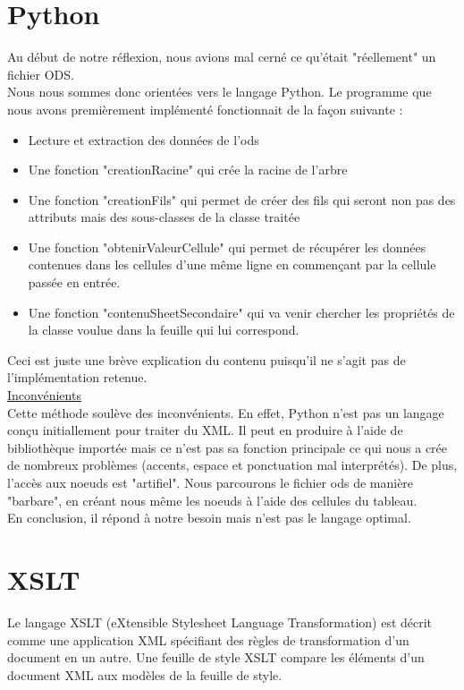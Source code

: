 \documentclass[11pt]{report}
\begin{document}
\section{Python}
Au début de notre réflexion, nous avions mal cerné ce qu'était "réellement" un fichier ODS.\\
Nous nous sommes donc orientées vers le langage Python. Le programme que nous avons premièrement implémenté fonctionnait de la façon suivante :
\begin{itemize}
    \item Lecture et extraction des données de l'ods
    \item Une fonction "creationRacine" qui crée la racine de l'arbre
    \item Une fonction "creationFils" qui permet de créer des fils qui seront non pas des attributs mais des sous-classes de la classe traitée 
    \item Une fonction "obtenirValeurCellule" qui permet de récupérer les données contenues dans les cellules d'une même ligne en commençant par la cellule passée en entrée.
    \item Une fonction "contenuSheetSecondaire" qui va venir chercher les propriétés de la classe voulue dans la feuille qui lui correspond.
\end{itemize}

\vspace{0.5cm}
Ceci est juste une brève explication du contenu puisqu'il ne s'agit pas de l'implémentation retenue.\\

\underline{Inconvénients}\\
Cette méthode soulève des inconvénients. En effet, Python n'est pas un langage conçu initiallement pour traiter du XML. Il peut en produire à l'aide de bibliothèque importée mais ce n'est pas sa fonction principale ce qui nous a crée de nombreux problèmes (accents, espace et ponctuation mal interprétés). De plus, l'accès aux noeuds est "artifiel". Nous parcourons le fichier ods de manière "barbare", en créant nous même les noeuds à l'aide des cellules du tableau. \\

En conclusion, il répond à notre besoin mais n'est pas le langage optimal.


\section{XSLT}
Le langage XSLT (eXtensible Stylesheet Language Transformation) est décrit comme une application XML spécifiant des règles de transformation d’un document en un autre. Une feuille de style XSLT compare les éléments d’un document XML aux modèles de la feuille de style.\\
\end{document}
